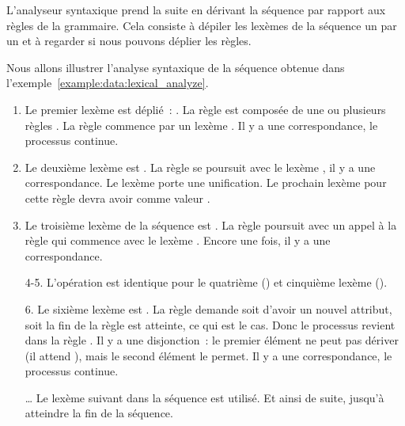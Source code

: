 L'analyseur syntaxique prend la suite en dérivant la séquence par rapport aux
règles de la grammaire. Cela consiste à dépiler les lexèmes de la séquence un
par un et à regarder si nous pouvons déplier les règles.

\begin{example}[Analyse syntaxique de \code{<a x="y"><b /><c>foo</c></a>}]
\label{example:data:syntactic_analyze}

Nous allons illustrer l'analyse syntaxique de la séquence obtenue dans
l'exem\-ple~\ref{example:data:lexical_analyze}.

\begin{enumerate}

\item Le premier lexème est déplié~: . La règle  est composée
de une ou plusieurs règles . La règle  commence par un
lexème . Il y a une correspondance, le processus continue.

\item Le deuxième lexème est . La règle  se poursuit avec
le lexème , il y a une correspondance. Le lexème  porte
une unification. Le prochain lexème  pour cette règle devra avoir
comme valeur .

\item Le troisième lexème de la séquence est . La règle 
poursuit avec un appel à la règle  qui commence avec le lexème
. Encore une fois, il y a une correspondance.

\item[4-5.] L'opération est identique pour le quatrième () et
cinquième lexème ().

\item[6.] Le sixième lexème est . La règle  demande
soit d'avoir un nouvel attribut, soit la fin de la règle est atteinte, ce qui
est le cas. Donc le processus revient dans la règle . Il y a une
disjonction~: le premier élément ne peut pas dériver  (il attend
), mais le second élément le permet. Il y a une correspondance, le
processus continue.

\item[…] Le lexème suivant dans la séquence est utilisé. Et ainsi de suite,
jusqu'à atteindre la fin de la séquence.

\end{enumerate}

\end{example}

